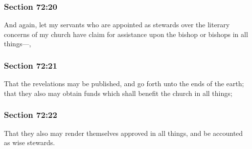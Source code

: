 	\subsubsection{Section 72:20} %
		\label{DC72-20}

		And again, let my servants who are appointed as stewards over the literary concerns of my church have claim for assistance upon the bishop or bishops in all things---,


	\subsubsection{Section 72:21} %
		\label{DC72-21}

		That the revelations may be published, and go forth unto the ends of the earth; that they also may obtain funds which shall benefit the church in all things;


	\subsubsection{Section 72:22} %
		\label{DC72-22}

		That they also may render themselves approved in all things, and be accounted as wise stewards.


